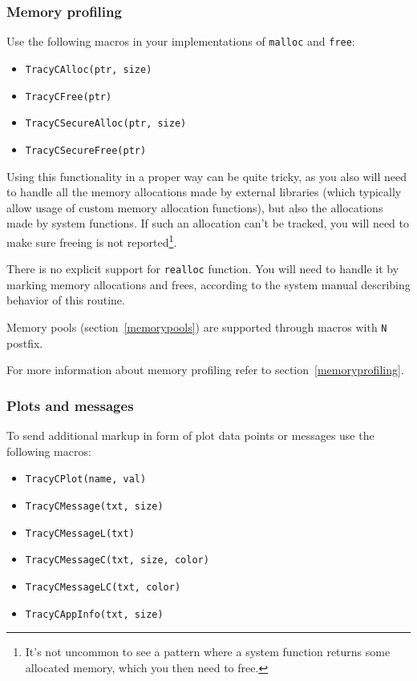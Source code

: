 \documentclass[hidelinks,titlepage,a4paper]{article}
\begin{document}
\subsubsection{Memory profiling}

Use the following macros in your implementations of \texttt{malloc} and \texttt{free}:

\begin{itemize}
\item \texttt{TracyCAlloc(ptr, size)}
\item \texttt{TracyCFree(ptr)}
\item \texttt{TracyCSecureAlloc(ptr, size)}
\item \texttt{TracyCSecureFree(ptr)}
\end{itemize}

Using this functionality in a proper way can be quite tricky, as you also will need to handle all the memory allocations made by external libraries (which typically allow usage of custom memory allocation functions), but also the allocations made by system functions. If such an allocation can't be tracked, you will need to make sure freeing is not reported\footnote{It's not uncommon to see a pattern where a system function returns some allocated memory, which you then need to free.}.

There is no explicit support for \texttt{realloc} function. You will need to handle it by marking memory allocations and frees, according to the system manual describing behavior of this routine.

Memory pools (section~\ref{memorypools}) are supported through macros with \texttt{N} postfix.

For more information about memory profiling refer to section~\ref{memoryprofiling}.

\subsubsection{Plots and messages}

To send additional markup in form of plot data points or messages use the following macros:

\begin{itemize}
\item \texttt{TracyCPlot(name, val)}
\item \texttt{TracyCMessage(txt, size)}
\item \texttt{TracyCMessageL(txt)}
\item \texttt{TracyCMessageC(txt, size, color)}
\item \texttt{TracyCMessageLC(txt, color)}
\item \texttt{TracyCAppInfo(txt, size)}
\end{itemize}
\end{document}
